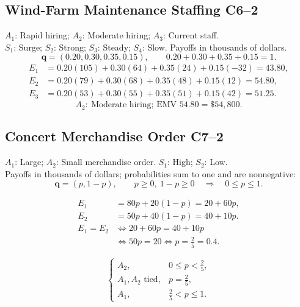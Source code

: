 {	\subsection{Wind-Farm Maintenance Staffing \hfill C6--2}
	$A_1$: Rapid hiring; $A_2$: Moderate hiring; $A_3$: Current staff.\\
	$S_1$: Surge; $S_2$: Strong; $S_3$: Steady; $S_4$: Slow. Payoffs in thousands of dollars.
	\[\boldsymbol{q}=(0.20,0.30,0.35,0.15),\qquad 0.20+0.30+0.35+0.15=1.\]
	\begin{align*}
		E_1&=0.20(105)+0.30(64)+0.35(24)+0.15(-32)=43.80,\\
		E_2&=0.20(79)+0.30(68)+0.35(48)+0.15(12)=54.80,\\
		E_3&=0.20(53)+0.30(55)+0.35(51)+0.15(42)=51.25.
	\end{align*}
	\[\boxed{A_2:\ \text{Moderate hiring; EMV }54.80=\$54{,}800.}\]

	\subsection{Concert Merchandise Order \hfill C7--2}
	$A_1$: Large; $A_2$: Small merchandise order. $S_1$: High; $S_2$: Low.\\
	Payoffs in thousands of dollars; probabilities sum to one and are nonnegative:
	\[\boldsymbol{q}=(p,1-p),\qquad p\ge0,\ 1-p\ge0
	\quad\Longrightarrow\quad 0\le p\le1.\]
	\noindent\begin{minipage}[t]{0.55\textwidth}
		\vspace{0pt}
		\begin{align*}
			E_1&=80p+20(1-p)=20+60p,\\
			E_2&=50p+40(1-p)=40+10p.\\[2pt]
			E_1=E_2&\iff 20+60p=40+10p\\
			&\iff 50p=20\iff p=\tfrac25=0.4.
		\end{align*}
	\end{minipage}\hfill
	\begin{minipage}[t]{0.42\textwidth}
		\vspace{0pt}
		\[\boxed{\begin{cases}
			A_2,&0\le p<\tfrac25,\\
			A_1,A_2\text{ tied},&p=\tfrac25,\\
			A_1,&\tfrac25<p\le1.
		\end{cases}}\]
	\end{minipage}

}
